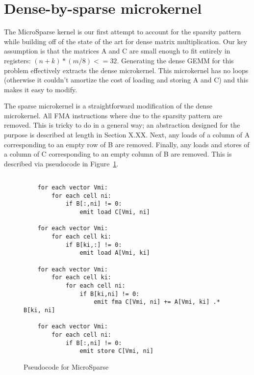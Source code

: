 \section{Dense-by-sparse microkernel}

The MicroSparse kernel is our first attempt to account for the sparsity pattern while building off of the state of the art for dense matrix multiplication. Our key assumption is that the matrices A and C are small enough to fit entirely in registers: $(n + k) * (m/8) <= 32$. Generating the dense GEMM for this problem effectively extracts the dense microkernel. This microkernel has no loops (otherwise it couldn't amortize the cost of loading and storing A and C) and this makes it easy to modify.

The sparse microkernel is a straightforward modification of the dense microkernel. All FMA instructions  where  due to the sparsity pattern are removed. This is tricky to do in a general way; an abstraction designed for the purpose is described at length in Section X.XX. Next, any loads of a column of A corresponding to an empty row of B are removed. Finally, any loads and stores of a column of C corresponding to an empty column of B are removed. This is described via pseudocode in Figure~\ref{fig:micropseudo}.

\begin{figure}[htb]
\centering
  \begin{verbatim}

    for each vector Vmi:
        for each cell ni:
            if B[:,ni] != 0:
                emit load C[Vmi, ni]

    for each vector Vmi:
        for each cell ki:
            if B[ki,:] != 0:
                emit load A[Vmi, ki]

    for each vector Vmi:
        for each cell ki:
            for each cell ni:
                if B[ki,ni] != 0:
                    emit fma C[Vmi, ni] += A[Vmi, ki] .* B[ki, ni]

    for each vector Vmi:
        for each cell ni:
            if B[:,ni] != 0:
                emit store C[Vmi, ni]

  \end{verbatim}
  \caption{Pseudocode for MicroSparse}
\label{fig:micropseudo}
\end{figure}

